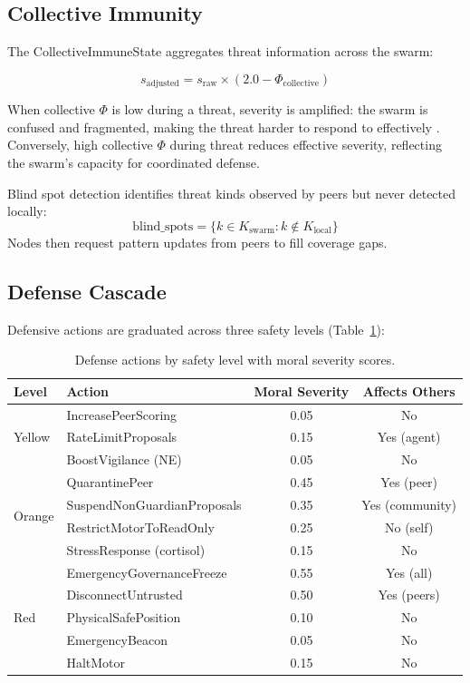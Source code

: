 \documentclass[11pt,a4paper]{article}
\begin{document}
\subsection{Collective Immunity}

The CollectiveImmuneState aggregates threat information across the swarm:

\begin{equation}
s_{\text{adjusted}} = s_{\text{raw}} \times (2.0 - \Phi_{\text{collective}})
\end{equation}

When collective $\Phi$ is low during a threat, severity is amplified: the swarm is confused and fragmented, making the threat harder to respond to effectively \citep{woolley2010}. Conversely, high collective $\Phi$ during threat reduces effective severity, reflecting the swarm's capacity for coordinated defense.

Blind spot detection identifies threat kinds observed by peers but never detected locally:
\begin{equation}
\text{blind\_spots} = \{k \in K_{\text{swarm}} : k \notin K_{\text{local}}\}
\end{equation}
Nodes then request pattern updates from peers to fill coverage gaps.

\subsection{Defense Cascade}

Defensive actions are graduated across three safety levels (Table~\ref{tab:defense}):

\begin{table}[h]
\centering
\caption{Defense actions by safety level with moral severity scores.}
\label{tab:defense}
\begin{tabular}{llcc}
\toprule
\textbf{Level} & \textbf{Action} & \textbf{Moral Severity} & \textbf{Affects Others} \\
\midrule
\multirow{3}{*}{Yellow} & IncreasePeerScoring & 0.05 & No \\
 & RateLimitProposals & 0.15 & Yes (agent) \\
 & BoostVigilance (NE) & 0.05 & No \\
\midrule
\multirow{4}{*}{Orange} & QuarantinePeer & 0.45 & Yes (peer) \\
 & SuspendNonGuardianProposals & 0.35 & Yes (community) \\
 & RestrictMotorToReadOnly & 0.25 & No (self) \\
 & StressResponse (cortisol) & 0.15 & No \\
\midrule
\multirow{5}{*}{Red} & EmergencyGovernanceFreeze & 0.55 & Yes (all) \\
 & DisconnectUntrusted & 0.50 & Yes (peers) \\
 & PhysicalSafePosition & 0.10 & No \\
 & EmergencyBeacon & 0.05 & No \\
 & HaltMotor & 0.15 & No \\
\bottomrule
\end{tabular}
\end{table}
\end{document}
